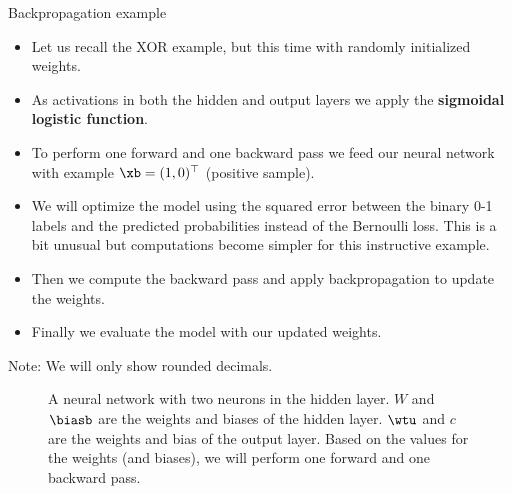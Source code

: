 \begin{vbframe}{Backpropagation example}
  \begin{itemize}
    \item Let us recall the XOR example, but this time with randomly initialized weights.
    \item As activations in both the hidden and output layers we apply the \textbf{sigmoidal logistic function}.
    \item To perform one forward and one backward pass we feed our neural network with example $\xb = (1,0)^\top$ (positive sample).
    \item We will optimize the model using the squared error between the binary 0-1 labels and the predicted probabilities instead of the Bernoulli loss. This is
      a bit unusual but computations become simpler for this instructive example.
    \item Then we compute the backward pass and apply backpropagation to update the weights.
    \item Finally we evaluate the model with our updated weights.
  \end{itemize}
\begin{footnotesize}
  Note: We will only show rounded decimals. 
\end{footnotesize}
\framebreak

  \begin{figure}
    \centering
      \caption{A neural network with two neurons in the hidden layer. $W$ and $\biasb$ are the weights and biases of the hidden layer. $\wtu$ and $c$ are the weights and bias of the output layer. Based on the values for the weights (and biases), we will perform one forward and one backward pass.}
  \end{figure}
\end{vbframe} 

